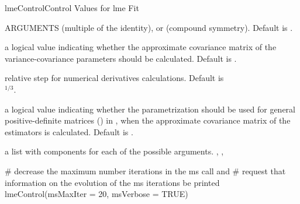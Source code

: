 \documentclass[pdftex]{article} \usepackage{url,graphicx}
\begin{document}
\begin{Helpfile}{lmeControl}{Control Values for lme Fit}
\begin{Argument}{ARGUMENTS}
 (multiple of the identity),  or
 (compound symmetry). Default is .
\item[\Co{apVar:}]
a logical value indicating whether the approximate
covariance matrix of the variance-covariance parameters should be
calculated. Default is .
\item[\Co{.relStep:}]
relative step for numerical derivatives
calculations. Default is \\ $^{1/3}$.
\item[\Co{natural:}]
a logical value indicating whether the 
parametrization should be used for general positive-definite matrices
() in , when the approximate covariance
matrix of the estimators is calculated. Default is .
\end{Argument}
a list with components for each of the possible arguments.
, , 
\need 15pt
\vspace{-16pt} 
\begin{Example}
# decrease the maximum number iterations in the ms call and
# request that information on the evolution of the ms iterations be printed
lmeControl(msMaxIter = 20, msVerbose = TRUE)
\end{Example}
\end{Helpfile}
\end{document}
